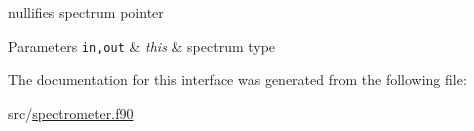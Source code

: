 nullifies spectrum pointer 


\begin{DoxyParams}[1]{Parameters}
\mbox{\tt in,out}  & {\em this} & spectrum type \\
\hline
\end{DoxyParams}


The documentation for this interface was generated from the following file\+:\begin{DoxyCompactItemize}
\item 
src/\hyperlink{spectrometer_8f90}{spectrometer.\+f90}\end{DoxyCompactItemize}
